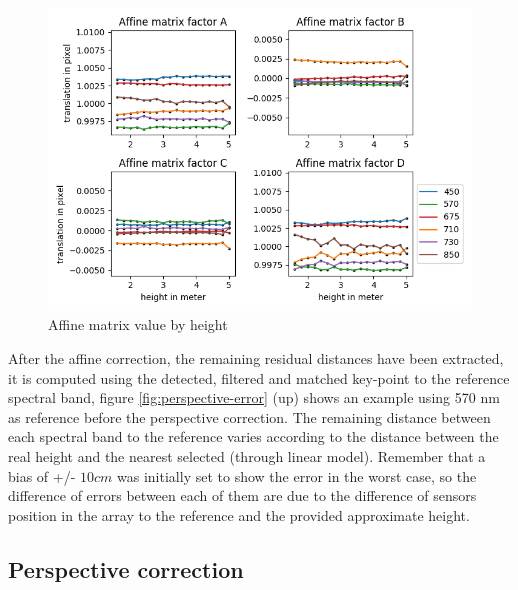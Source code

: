\documentclass[a4paper,twoside]{article}
\begin{document}
	\begin{figure}[h]
		\centering
		\includegraphics[width=\linewidth]{../figures/affine-rotation-height.png}
		\caption{Affine matrix value by height}
		\label{fig:affine-rotation-height}
	\end{figure}
	
	After the affine correction, the remaining residual distances have been extracted,
	it is computed using the detected, filtered and matched key-point to the reference spectral band,
	figure \ref{fig:perspective-error} (up) %
	shows an example using 570 nm as reference before the perspective correction.
	The remaining distance between each spectral band to the reference varies according to the distance between
	the real height and the nearest selected (through linear model).
	Remember that a bias of +/- $10cm$ was initially set to show the error in the worst case,
	so the difference of errors between each of them are due to the difference of sensors position in the array to the reference and the provided approximate height.
	
	
	\subsection{Perspective correction}
	
\end{document}
